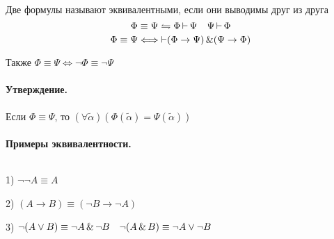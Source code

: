 \begin{definition}
Две формулы называют эквивалентными, если они выводимы друг из друга
\[
\Phi \equiv \Psi \leftrightharpoons \Phi \operatorname{\vdash} \Psi \quad \Psi \operatorname{\vdash} \Phi
\]
\[
\Phi \equiv \Psi \Longleftrightarrow \operatorname{\vdash} (\Phi \to \Psi)\operatorname{\&} (\Psi \to \Phi)
\]
\end{definition}

Также $\Phi \equiv \Psi \Longleftrightarrow \lnot \Phi \equiv \lnot \Psi$

\paragraph*{Утверждение.} Если $\Phi \equiv \Psi$, то  $(\forall \widetilde{\alpha})
(\Phi(\widetilde{\alpha}) = \Psi(\widetilde{\alpha}))$


\paragraph*{Примеры эквивалентности.} ${}$ \newline

1) $\lnot\lnot A \equiv A$

2)  $(A \to B) \equiv (\lnot B \to \lnot A)$

3) $\lnot ( A \lor B) \equiv \lnot A \operatorname{\&} \lnot B \quad 
\lnot(A\operatorname{\&} B) \equiv \lnot A \lor \lnot B$


